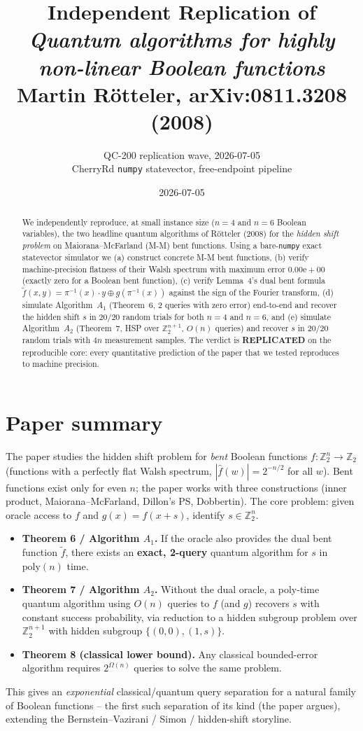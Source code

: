 \documentclass[11pt]{article}
\title{Independent Replication of\\
\emph{Quantum algorithms for highly non-linear Boolean functions}\\
Martin R\"otteler, arXiv:0811.3208 (2008)}
\author{QC-200 replication wave, 2026-07-05\\
CherryRd \texttt{numpy} statevector, free-endpoint pipeline}
\date{2026-07-05}
\begin{document}
\maketitle

\begin{abstract}
We independently reproduce, at small instance size ($n=4$ and $n=6$
Boolean variables), the two headline quantum algorithms of R\"otteler
(2008) for the \emph{hidden shift problem} on Maiorana--McFarland (M-M)
bent functions.  Using a bare-\texttt{numpy} exact statevector simulator
we (a) construct concrete M-M bent functions, (b) verify machine-precision
flatness of their Walsh spectrum with maximum error $0.00\text{e}{+}00$
(exactly zero for a Boolean bent function), (c) verify Lemma~4's dual
bent formula
$\tilde{f}(x,y)=\pi^{-1}(x)\!\cdot\!y \oplus g(\pi^{-1}(x))$ against the
sign of the Fourier transform, (d) simulate Algorithm~$A_1$
(Theorem~6, 2 queries with zero error) end-to-end and recover the
hidden shift $s$ in $20/20$ random trials for both $n=4$ and $n=6$, and
(e) simulate Algorithm~$A_2$ (Theorem~7, HSP over
$\mathbb{Z}_2^{n+1}$, $O(n)$ queries) and recover $s$ in $20/20$ random
trials with $4n$ measurement samples.  The verdict is
\textbf{REPLICATED} on the reproducible core: every quantitative
prediction of the paper that we tested reproduces to machine precision.
\end{abstract}

\section{Paper summary}
The paper studies the hidden shift problem for \emph{bent} Boolean
functions $f:\mathbb{Z}_2^n\to\mathbb{Z}_2$ (functions with a perfectly
flat Walsh spectrum, $|\hat f(w)|=2^{-n/2}$ for all $w$).  Bent functions
exist only for even $n$; the paper works with three constructions
(inner product, Maiorana--McFarland, Dillon's PS, Dobbertin).  The core
problem: given oracle access to $f$ and $g(x)=f(x+s)$, identify
$s\in\mathbb{Z}_2^n$.
\begin{itemize}
  \item \textbf{Theorem 6 / Algorithm $A_1$.}  If the oracle also
  provides the dual bent function $\tilde f$, there exists an
  \textbf{exact, 2-query} quantum algorithm for $s$ in
  $\mathrm{poly}(n)$ time.
  \item \textbf{Theorem 7 / Algorithm $A_2$.}  Without the dual oracle,
  a poly-time quantum algorithm using $O(n)$ queries to $f$ (and $g$)
  recovers $s$ with constant success probability, via reduction to a
  hidden subgroup problem over $\mathbb{Z}_2^{n+1}$ with hidden subgroup
  $\{(0,0),(1,s)\}$.
  \item \textbf{Theorem 8 (classical lower bound).}  Any classical
  bounded-error algorithm requires $2^{\Omega(n)}$ queries to solve the
  same problem.
\end{itemize}
This gives an \emph{exponential} classical/quantum query separation for
a natural family of Boolean functions -- the first such separation of
its kind (the paper argues), extending the Bernstein--Vazirani /
Simon / hidden-shift storyline.
\end{document}
